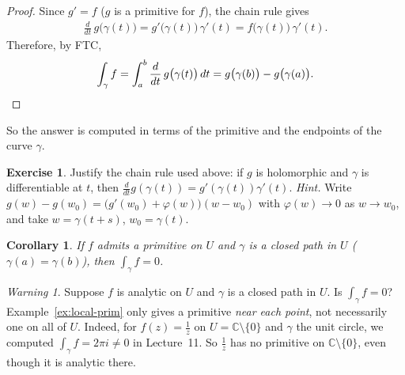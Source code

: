 \documentclass[11pt]{article}
\theoremstyle{plain}
\newtheorem{corollary}[theorem]{Corollary}
\theoremstyle{definition}
\newtheorem{exercise}[theorem]{Exercise}
\theoremstyle{remark}
\newtheorem*{warning}{Warning}
\numberwithin{equation}{section}
\newcommand{\be}{\begin{eqnarray}}
\newcommand{\ee}{\end{eqnarray}}
\newcommand{\C}{\mathbb{C}}
\begin{document}
\noindent
\begin{minipage}[c]{0.36\textwidth}
\centering
{}
\end{minipage}\hfill
\begin{minipage}[c]{0.6\textwidth}
\begin{proof}
Since $g'=f$ ($g$ is a primitive for $f$), the chain rule gives
\be
 \frac{d}{dt}\,g\bigl(\gamma(t)\bigr)=g'\bigl(\gamma(t)\bigr)\,\gamma'(t)
 =f\bigl(\gamma(t)\bigr)\,\gamma'(t).
\ee
Therefore, by FTC,
\be
 \int_\gamma f=\int_a^b\frac{d}{dt}\,g\bigl(\gamma(t)\bigr)\,dt
 =g\bigl(\gamma(b)\bigr)-g\bigl(\gamma(a)\bigr). \qedhere
\ee
\end{proof}
\end{minipage}

So the answer is computed in terms of the primitive and the endpoints of the
curve $\gamma$.

\begin{exercise}
Justify the chain rule used above: if $g$ is holomorphic and $\gamma$ is
differentiable at $t$, then $\frac{d}{dt}g(\gamma(t))=g'(\gamma(t))\gamma'(t)$.
\emph{Hint.} Write $g(w)-g(w_0)=\bigl(g'(w_0)+\varphi(w)\bigr)(w-w_0)$ with
$\varphi(w)\to0$ as $w\to w_0$, and take $w=\gamma(t+s)$, $w_0=\gamma(t)$.
\end{exercise}

\begin{corollary}
\label{cor:closed-zero}
If $f$ admits a primitive on $U$ and $\gamma$ is a closed path in $U$
($\gamma(a)=\gamma(b)$), then $\int_\gamma f=0$.
\end{corollary}

\begin{warning}
Suppose $f$ is analytic on $U$ and $\gamma$ is a closed path in $U$. Is
$\int_\gamma f=0$? Example~\ref{ex:local-prim} only gives a primitive
\emph{near each point}, not necessarily one on all of $U$. Indeed, for
$f(z)=\frac1z$ on $U=\C\setminus\{0\}$ and $\gamma$ the unit circle, we
computed $\int_\gamma f=2\pi i\neq0$ in Lecture~11. So $\frac1z$ has no
primitive on $\C\setminus\{0\}$, even though it is analytic there.
\end{warning}
\end{document}
